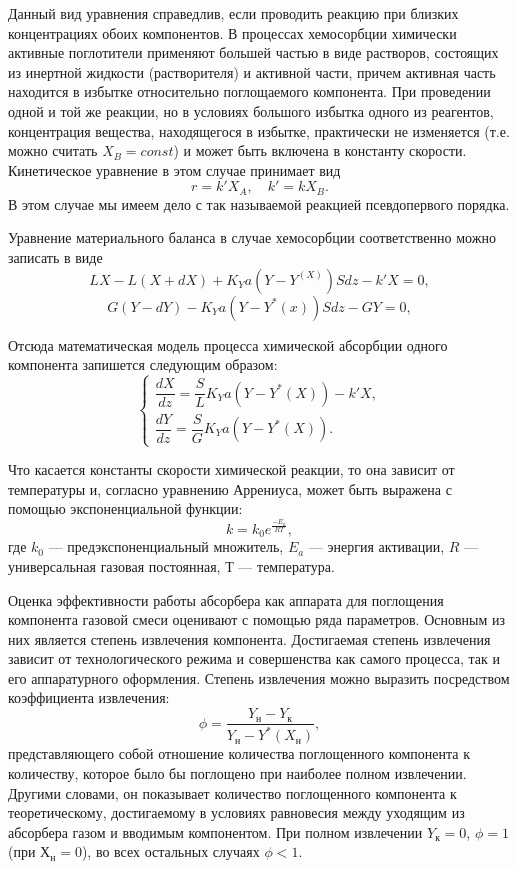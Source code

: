 Данный вид уравнения справедлив, если проводить реакцию при близких концентрациях обоих компонентов. В процессах хемосорбции химически активные поглотители применяют большей частью в виде растворов, состоящих из инертной жидкости (растворителя) и активной части, причем активная часть находится в избытке относительно поглощаемого компонента. При проведении одной и той же реакции, но в условиях большого избытка одного из реагентов, концентрация вещества, находящегося в избытке, практически не изменяется (т.е. можно считать $X_B=const$) и может быть включена в константу скорости. Кинетическое уравнение в этом случае принимает вид
\begin{equation}
r=k' X_A, \quad k'=k X_B.
\end{equation}
В этом случае мы имеем дело с так называемой реакцией псевдопервого порядка.

Уравнение материального баланса в случае хемосорбции соответственно можно записать в виде
\begin{equation}
L X - L(X +dX) + K_Y a (Y-Y^(X))Sdz-k'X=0, 
\end{equation}
\begin{equation}
G(Y-dY)-K_Y a (Y-Y^*(x))Sdz- GY=0,
\end{equation}

Отсюда математическая модель процесса химической абсорбции одного компонента запишется следующим образом:
\begin{equation}
\left\lbrace 
\begin{gathered} 
\dfrac{dX}{dz}=\dfrac{S}{L} K_Y a (Y-Y^*(X))-k'X,
\\
\dfrac{dY}{dz}=\dfrac{S}{G} K_Y a (Y-Y^*(X)).
\end{gathered} 
\right.
\end{equation}

Что касается константы скорости химической реакции, то она зависит от температуры и, согласно уравнению Аррениуса, может быть выражена с помощью экспоненциальной функции:
\begin{equation}
	k=k_0 e^{\frac{-E_a}{RT}},
\end{equation}
где $k_0$ --- предэкспоненциальный множитель, $E_a$ --- энергия активации, $R$ --- универсальная газовая постоянная, $Т$ --- температура. 

Оценка эффективности работы абсорбера как аппарата для поглощения компонента газовой смеси оценивают с помощью ряда параметров. Основным из них является степень извлечения компонента. Достигаемая степень извлечения зависит от технологического режима и совершенства как самого процесса, так и его аппаратурного оформления. Степень извлечения можно выразить посредством коэффициента извлечения:
\begin{equation}
	\phi =\dfrac{Y_н - Y_к}{Y_н - Y^*(X_н)},
\end{equation}
представляющего собой отношение количества поглощенного компонента к количеству, которое было бы поглощено при наиболее полном извлечении. Другими словами, он показывает количество поглощенного компонента к теоретическому, достигаемому в условиях равновесия между уходящим из абсорбера газом и вводимым компонентом. При полном извлечении $Y_к=0$, $\phi=1$ (при $Х_н=0$), во всех остальных случаях $\phi<1$.
 
